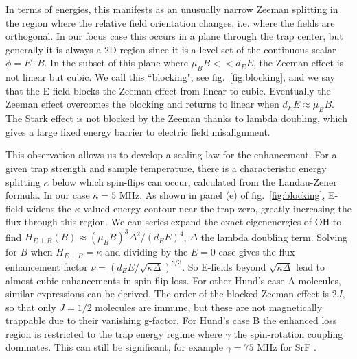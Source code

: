 \documentclass[%
 reprint,
 amsmath,amssymb,
 aps,
prl,
]{revtex4-1}
\begin{document}
In terms of energies, this manifests as an unusually narrow Zeeman splitting in the region where the relative field orientation changes, i.e. where the fields are orthogonal. In our focus case this occurs in a plane through the trap center, but generally it is always a 2D region since it is a level set of the continuous scalar $\phi = E\cdot B$. In the subset of this plane where $\mu_BB<<d_EE$, the Zeeman effect is not linear but cubic. We call this ``blocking", see fig.~\ref{fig:blocking}, and we say that the E-field blocks the Zeeman effect from linear to cubic. Eventually the Zeeman effect overcomes the blocking and returns to linear when $d_EE\approx\mu_BB$. The Stark effect is not blocked by the Zeeman thanks to lambda doubling, which gives a large fixed energy barrier to electric field misalignment.

This observation allows us to develop a scaling law for the enhancement. For a given trap strength and sample temperature, there is a characteristic energy splitting $\kappa$ below which spin-flips can occur, calculated from the Landau-Zener formula. In our case $\kappa=5\text{ MHz}$. As shown in panel (e) of fig.~\ref{fig:blocking}, E-field widens the $\kappa$ valued energy contour near the trap zero, greatly increasing the flux through this region. We can series expand the exact eigenenergies of OH to find $H_{E\!\perp\!B}(B)\approx (\mu_BB)^3\Delta^2/(d_EE)^4$, $\Delta$ the lambda doubling term. Solving for $B$ when $H_{E\!\perp\!B}=\kappa$ and dividing by the $E=0$ case gives the flux enhancement factor $\nu = (d_EE/\sqrt{\kappa\Delta})^{8/3}$. So E-fields beyond $\sqrt{\kappa\Delta}$ lead to almost cubic enhancements in spin-flip loss. For other Hund's case A molecules, similar expressions can be derived. The order of the blocked Zeeman effect is $2J$, so that only $J=1/2$ molecules are immune, but these are not magnetically trappable due to their vanishing g-factor. For Hund's case B the enhanced loss region is restricted to the trap energy regime where $\gamma$ the spin-rotation coupling dominates. This can still be significant, for example $\gamma=75\text{ MHz}$ for SrF \cite{Quemener2016}. 


\end{document}
